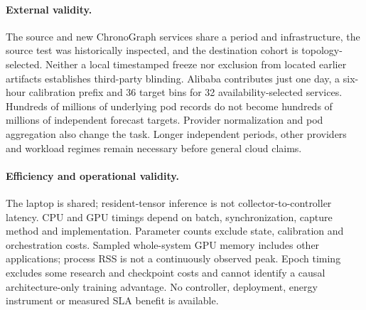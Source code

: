 \paragraph{External validity.} The source and new ChronoGraph services share a period and infrastructure, the source test was historically inspected, and the destination cohort is topology-selected. Neither a local timestamped freeze nor exclusion from located earlier artifacts establishes third-party blinding. Alibaba contributes just one day, a six-hour calibration prefix and 36 target bins for 32 availability-selected services. Hundreds of millions of underlying pod records do not become hundreds of millions of independent forecast targets. Provider normalization and pod aggregation also change the task. Longer independent periods, other providers and workload regimes remain necessary before general cloud claims.

\paragraph{Efficiency and operational validity.} The laptop is shared; resident-tensor inference is not collector-to-controller latency. CPU and GPU timings depend on batch, synchronization, capture method and implementation. Parameter counts exclude state, calibration and orchestration costs. Sampled whole-system GPU memory includes other applications; process RSS is not a continuously observed peak. Epoch timing excludes some research and checkpoint costs and cannot identify a causal architecture-only training advantage. No controller, deployment, energy instrument or measured SLA benefit is available.

